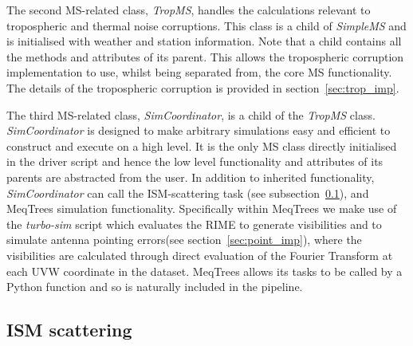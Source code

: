 The second MS-related class, \emph{TropMS}, handles the calculations relevant to tropospheric and thermal noise corruptions. This class is a child of {\it SimpleMS} and is initialised with weather and station information. Note that a child contains all the methods and attributes of its parent. This allows the tropospheric corruption implementation to use, whilst being separated from, the core MS functionality. The details of the tropospheric corruption is provided in section~\ref{sec:trop_imp}. 

The third MS-related class, \emph{SimCoordinator}, is a child of the {\it TropMS} class. {\it SimCoordinator} is designed to make arbitrary simulations easy and efficient to construct and execute on a high level. It is the only MS class directly initialised in the driver script and hence the low level functionality and attributes of its parents are abstracted from the user. In addition to inherited functionality, {\it SimCoordinator} can call the ISM-scattering task (see subsection~\ref{sec:ism_imp}), and {\sc MeqTrees} simulation functionality.
Specifically within {\sc MeqTrees} we make use of the {\it turbo-sim} script which evaluates the RIME to generate visibilities and to simulate antenna pointing errors(see section~\ref{sec:point_imp}), where the visibilities are calculated through direct evaluation of the Fourier Transform at each UVW coordinate in the dataset. {\sc MeqTrees} allows its tasks to be called by a {\sc Python} function and so is naturally included in the pipeline.
 

\subsection{ISM scattering}\label{sec:ism_imp}

